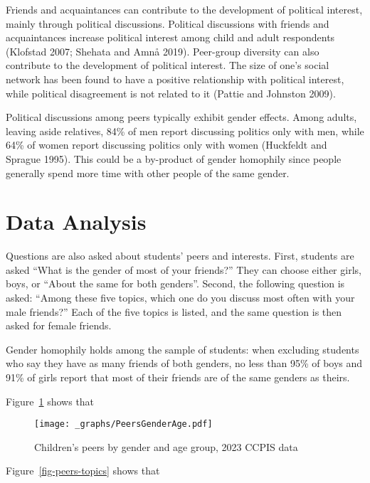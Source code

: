 \documentclass[
  letterpaper,
  DIV=11,
  numbers=noendperiod]{scrreprt}
\begin{document}
Friends and acquaintances can contribute to the development of political
interest, mainly through political discussions. Political discussions
with friends and acquaintances increase political interest among child
and adult respondents (Klofstad 2007; Shehata and Amnå 2019). Peer-group
diversity can also contribute to the development of political interest.
The size of one's social network has been found to have a positive
relationship with political interest, while political disagreement is
not related to it (Pattie and Johnston 2009).

Political discussions among peers typically exhibit gender effects.
Among adults, leaving aside relatives, 84\% of men report discussing
politics only with men, while 64\% of women report discussing politics
only with women (Huckfeldt and Sprague 1995). This could be a by-product
of gender homophily since people generally spend more time with other
people of the same gender.

\hypertarget{data-analysis-2}{%
\section{Data Analysis}\label{data-analysis-2}}

Questions are also asked about students' peers and interests. First,
students are asked ``What is the gender of most of your friends?'' They
can choose either girls, boys, or ``About the same for both genders''.
Second, the following question is asked: ``Among these five topics,
which one do you discuss most often with your male friends?'' Each of
the five topics is listed, and the same question is then asked for
female friends.

Gender homophily holds among the sample of students: when excluding
students who say they have as many friends of both genders, no less than
95\% of boys and 91\% of girls report that most of their friends are of
the same genders as theirs.

Figure~\ref{fig-peers-genderage} shows that

\begin{figure}

{\centering \texttt{[image: \_graphs/PeersGenderAge.pdf]}

}

\caption{\label{fig-peers-genderage}Children's peers by gender and age
group, 2023 CCPIS data}

\end{figure}

Figure~\ref{fig-peers-topics} shows that
\end{document}
